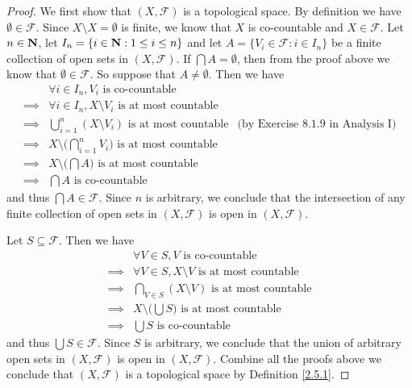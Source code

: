 \begin{proof}
    We first show that \((X, \mathcal{F})\) is a topological space.
    By definition we have \(\emptyset \in \mathcal{F}\).
    Since \(X \setminus X = \emptyset\) is finite, we know that \(X\) is co-countable and \(X \in \mathcal{F}\).
    Let \(n \in \mathbf{N}\), let \(I_n = \{i \in \mathbf{N} : 1 \leq i \leq n\}\) and let \(A = \{V_i \in \mathcal{F} : i \in I_n\}\) be a finite collection of open sets in \((X, \mathcal{F})\).
    If \(\bigcap A = \emptyset\), then from the proof above we know that \(\emptyset \in \mathcal{F}\).
    So suppose that \(A \neq \emptyset\).
    Then we have
    \begin{align*}
                 & \forall i \in I_n, V_i \text{ is co-countable}                                                                        \\
        \implies & \forall i \in I_n, X \setminus V_i \text{ is at most countable}                                                       \\
        \implies & \bigcup_{i = 1}^n (X \setminus V_i) \text{ is at most countable}           & \text{(by Exercise 8.1.9 in Analysis I)} \\
        \implies & X \setminus \bigg(\bigcap_{i = 1}^n V_i\bigg) \text{ is at most countable}                                            \\
        \implies & X \setminus \bigg(\bigcap A\bigg) \text{ is at most countable}                                                        \\
        \implies & \bigcap A \text{ is co-countable}
    \end{align*}
    and thus \(\bigcap A \in \mathcal{F}\).
    Since \(n\) is arbitrary, we conclude that the intersection of any finite collection of open sets in \((X, \mathcal{F})\) is open in \((X, \mathcal{F})\).

    Let \(S \subseteq \mathcal{F}\).
    Then we have
    \begin{align*}
                 & \forall V \in S, V \text{ is co-countable}                     \\
        \implies & \forall V \in S, X \setminus V \text{ is at most countable}    \\
        \implies & \bigcap_{V \in S} (X \setminus V) \text{ is at most countable} \\
        \implies & X \setminus \bigg(\bigcup S\bigg) \text{ is at most countable} \\
        \implies & \bigcup S \text{ is co-countable}
    \end{align*}
    and thus \(\bigcup S \in \mathcal{F}\).
    Since \(S\) is arbitrary, we conclude that the union of arbitrary open sets in \((X, \mathcal{F})\) is open in \((X, \mathcal{F})\).
    Combine all the proofs above we conclude that \((X, \mathcal{F})\) is a topological space by Definition \ref{2.5.1}.


\end{proof}
